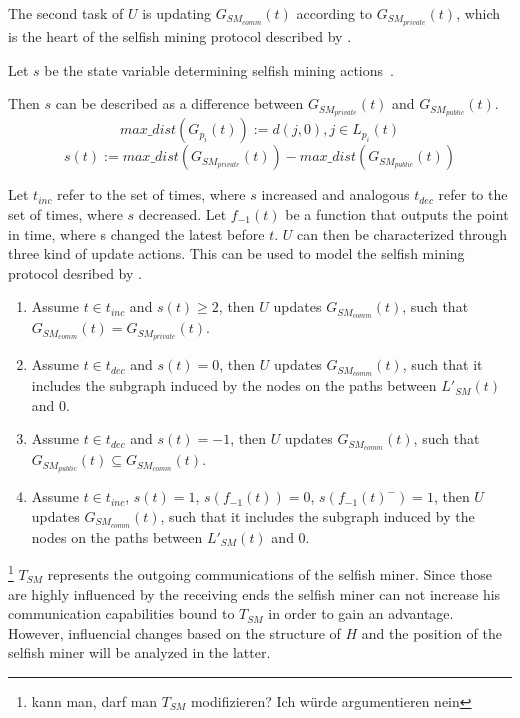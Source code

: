 The second task of $U$ is updating $G_{SM_{comm}}(t)$ according to $G_{SM_{private}}(t)$, which is the heart of the selfish mining protocol described by \citep{eyal}.

Let $s$ be the state variable determining selfish mining actions~\citep{eyal}.

Then $s$ can be described as a difference between $G_{SM_{private}}(t)$ and $G_{SM_{public}}(t)$.
\begin{equation}
max\_ dist(G_{p_i}(t)) := d(j,0), j \in L_{p_i}(t)
\end{equation}
\begin{equation}
s(t) := max\_ dist(G_{SM_{private}}(t)) - max\_ dist(G_{SM_{public}}(t))
\end{equation}

Let $t_{inc}$ refer to the set of times, where $s$ increased and analogous $t_{dec}$ refer to the set of times, where $s$ decreased.
Let $f_{-1}(t)$ be a function that outputs the point in time, where s changed the latest before $t$.
$U$ can then be characterized through three kind of update actions. This can be used to model the selfish mining protocol desribed by \citeauthor{eyal}.
\begin{enumerate}
\small
\item Assume $t \in t_{inc}$ and $s(t) \geq 2$, then $U$ updates $G_{SM_{comm}}(t)$, such that $G_{SM_{comm}}(t) = G_{SM_{private}}(t)$.
\item Assume $t \in t_{dec}$ and $s(t) = 0$, then $U$ updates $G_{SM_{comm}}(t)$, such that it includes the subgraph induced by the nodes on the paths between $L'_{SM}(t)$ and ${0}$.
\item Assume $t \in t_{dec}$ and $s(t) = -1$, then $U$ updates $G_{SM_{comm}}(t)$, such that $G_{SM_{public}}(t) \subseteq G_{SM_{comm}}(t)$.
\item Assume $t \in t_{inc}$, $s(t) = 1$, $s(f_{-1}(t)) = 0$, $s(f_{-1}(t)^-) = 1$, then $U$ updates $G_{SM_{comm}}(t)$, such that it includes the subgraph induced by the nodes on the paths between $L'_{SM}(t)$ and ${0}$.
\end{enumerate}
\footnote{kann man, darf man $T_{SM}$ modifizieren? Ich würde argumentieren nein}
$T_{SM}$ represents the outgoing communications of the selfish miner. Since those are highly influenced by the receiving ends the selfish miner can not increase his communication capabilities bound to $T_{SM}$ in order to gain an advantage. However, influencial changes based on the structure of $H$ and the position of the selfish miner will be analyzed in the latter.








